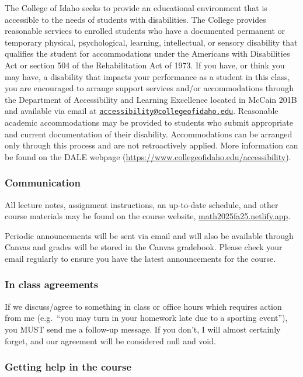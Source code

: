 \documentclass[
  letterpaper,
  DIV=11,
  numbers=noendperiod]{scrartcl}
\begin{document}
The College of Idaho seeks to provide an educational environment that is
accessible to the needs of students with disabilities. The College
provides reasonable services to enrolled students who have a documented
permanent or temporary physical, psychological, learning, intellectual,
or sensory disability that qualifies the student for accommodations
under the Americans with Disabilities Act or section 504 of the
Rehabilitation Act of 1973. If you have, or think you may have, a
disability that impacts your performance as a student in this class, you
are encouraged to arrange support services and/or accommodations through
the Department of Accessibility and Learning Excellence located in
McCain 201B and available via email at
\href{mailto:accessibility@collegeofidaho.edu}{\nolinkurl{accessibility@collegeofidaho.edu}}.
Reasonable academic accommodations may be provided to students who
submit appropriate and current documentation of their disability.
Accommodations can be arranged only through this process and are not
retroactively applied. More information can be found on the DALE webpage
(\url{https://www.collegeofidaho.edu/accessibility}).

\subsubsection{Communication}\label{communication}

All lecture notes, assignment instructions, an up-to-date schedule, and
other course materials may be found on the course website,
\href{https://math2025fa25.netlify.app}{math2025fa25.netlify.app}.

Periodic announcements will be sent via email and will also be available
through Canvas and grades will be stored in the Canvas gradebook. Please
check your email regularly to ensure you have the latest announcements
for the course.

\subsubsection{In class agreements}\label{in-class-agreements}

If we discuss/agree to something in class or office hours which requires
action from me (e.g.~``you may turn in your homework late due to a
sporting event''), you MUST send me a follow-up message. If you don't, I
will almost certainly forget, and our agreement will be considered null
and void.

\subsubsection{Getting help in the
course}\label{getting-help-in-the-course}
\end{document}

